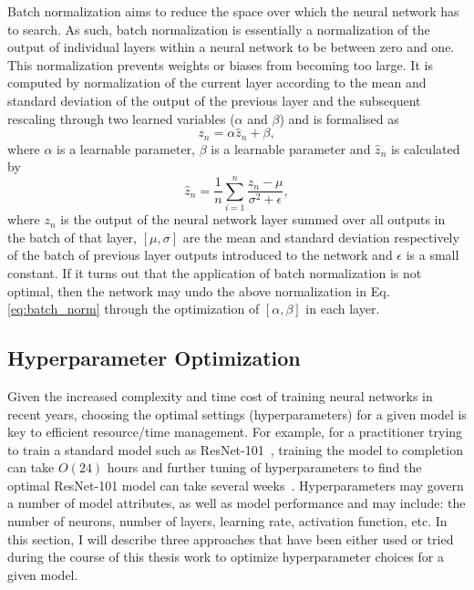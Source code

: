 %
%
Batch normalization aims to reduce the space over which the neural network has to search. As such, 
batch normalization is essentially a normalization of the output of individual layers within a neural network to be between zero and one. This normalization prevents weights or biases from becoming too large. It is computed by normalization of the current layer according to the mean and standard deviation of the output of the previous layer and the subsequent rescaling through two learned variables ($\alpha$ and $\beta$) and is formalised as 
\begin{equation}
    z_n = \alpha \hat{z}_n + \beta,
\end{equation}{}
where $\alpha$ is a learnable parameter, $\beta$ is a learnable parameter and $\hat{z}_n$ is calculated by 
\begin{equation}\label{eq:batch_norm}
    \hat{z}_n = \frac{1}{n} \sum_{i=1}^{n} \frac{z_n - \mu}{\sigma^{2} + \epsilon},
\end{equation}{}
where $z_n$ is the output of the neural network layer summed over all outputs in the batch of that layer, $[\mu,\sigma]$ are the mean and standard deviation respectively of the batch of previous layer outputs introduced to the network and $\epsilon$ is a small constant. If it turns out that the application of batch normalization is not optimal, then the network may undo the above normalization in Eq. \ref{eq:batch_norm} through the optimization of $[\alpha,\beta]$ in each layer.

\subsection{Hyperparameter Optimization}\label{sec:hyperpar_optim}
Given the increased complexity and time cost of training neural networks 
in recent years, choosing the optimal settings (hyperparameters) for a given 
model is key to efficient resource/time management. For example, for a 
practitioner trying to train a standard model such as ResNet-101~\cite{2015arXiv151203385H}, 
training the 
model to completion can take $O(24)$ hours and further tuning of hyperparameters to 
find the optimal ResNet-101 model can take several weeks~\cite{2018arXiv180705118L}. Hyperparameters 
may govern a number of model attributes, as well as model performance and may include: 
the number of neurons, number of layers, 
learning rate, activation function, etc.  
In this section, I will 
describe three approaches that have been either used or tried during the 
course of this thesis work to optimize hyperparameter choices for a given model.

